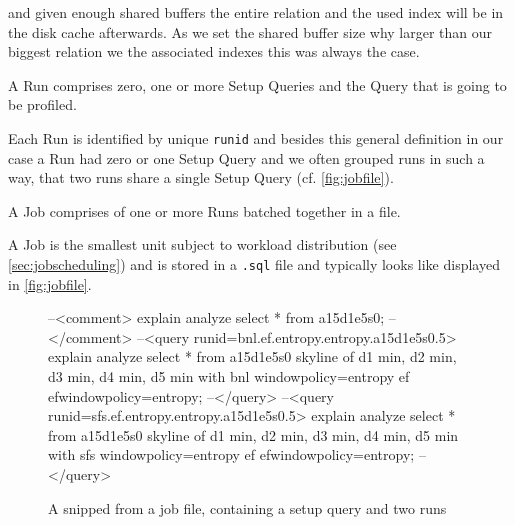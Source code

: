 \noindent
and given enough shared buffers the entire relation and the used index
will be in the disk cache afterwards. As we set the shared buffer size
why larger than our biggest relation we the associated indexes this
was always the case.

\begin{definition}[Run]
A Run comprises zero, one or more Setup Queries and the Query that is
going to be profiled.
\end{definition}

\noindent
Each Run is identified by unique \texttt{runid} and besides this
general definition in our case a Run had zero or one Setup Query and
we often grouped runs in such a way, that two runs share a single
Setup Query (cf. \autoref{fig:jobfile}).

\begin{definition}[Job]
A Job comprises of one or more Runs batched together in a file.
\end{definition}

\noindent
A Job is the smallest unit subject to workload distribution (see
\autoref{sec:jobscheduling}) and is stored in a \texttt{.sql} file
and typically looks like displayed in \autoref{fig:jobfile}.

\begin{figure}[htbp]
\begin{interactive}
--<comment>
explain analyze select * from a15d1e5s0;
--</comment>
--<query runid=bnl.ef.entropy.entropy.a15d1e5s0.5>
explain analyze select * from a15d1e5s0 \prebreak
  \postbreak skyline of d1 min, d2 min, d3 min, d4 min, d5 min \prebreak
  \postbreak with bnl windowpolicy=entropy ef efwindowpolicy=entropy;
--</query>
--<query runid=sfs.ef.entropy.entropy.a15d1e5s0.5>
explain analyze select * from a15d1e5s0 \prebreak
  \postbreak skyline of d1 min, d2 min, d3 min, d4 min, d5 min \prebreak
  \postbreak with sfs windowpolicy=entropy ef efwindowpolicy=entropy;
--</query>
\end{interactive}
\caption{A snipped from a job file, containing a setup query and two runs}
\label{fig:jobfile}
\end{figure}



